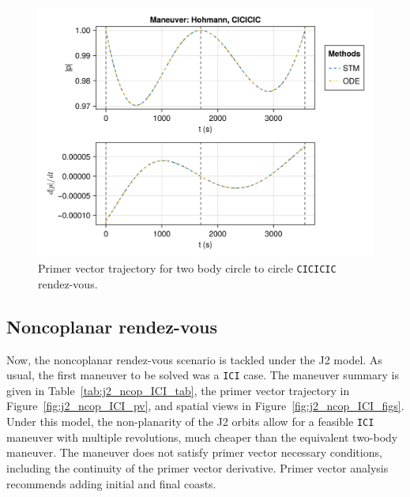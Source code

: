 \begin{figure}[htbp]
    \centering
    \includegraphics[width=\linewidth]{../results/j2/hohmann/CICICIC_primer_vector.png}
    \caption{Primer vector trajectory for two body circle to circle \texttt{CICICIC} rendez-vous.}
    \label{fig:j2_c2c_CICICIC_pv}
\end{figure}

\subsection{Noncoplanar rendez-vous}

Now, the noncoplanar rendez-vous scenario is tackled under the J2 model. As usual, the first maneuver to be solved was a \texttt{ICI} case. The maneuver summary is given in Table~\ref{tab:j2_ncop_ICI_tab}, the primer vector trajectory in Figure~\ref{fig:j2_ncop_ICI_pv}, and spatial views in Figure~\ref{fig:j2_ncop_ICI_figs}. Under this model, the non-planarity of the J2 orbits allow for a feasible \texttt{ICI} maneuver with multiple revolutions, much cheaper than the equivalent two-body maneuver. The maneuver does not satisfy primer vector necessary conditions, including the continuity of the primer vector derivative. Primer vector analysis recommends adding initial and final coasts.


